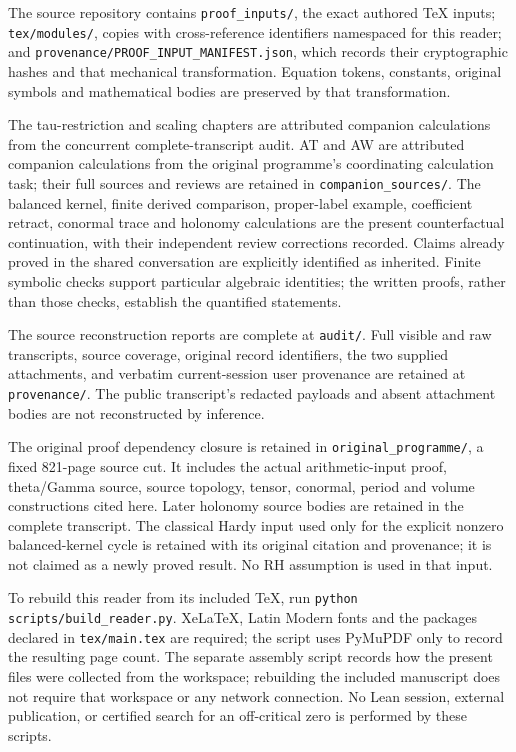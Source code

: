 \documentclass[11pt,a4paper,oneside,openany]{book}
\theoremstyle{definition}
\begin{document}
The source repository contains \texttt{proof\_inputs/}, the exact authored
TeX inputs; \texttt{tex/modules/}, copies with cross-reference identifiers
namespaced for this reader; and \nolinkurl{provenance/PROOF_INPUT_MANIFEST.json},
which records their cryptographic hashes and that mechanical transformation.
Equation tokens, constants, original symbols and mathematical bodies are
preserved by that transformation.

The tau-restriction and scaling chapters are attributed companion
calculations from the concurrent complete-transcript audit. AT and AW
are attributed companion calculations from the original programme's
coordinating calculation task; their full sources and reviews are retained
in \texttt{companion\_sources/}. The balanced
kernel, finite derived comparison, proper-label example, coefficient
retract, conormal trace and holonomy calculations are the present
counterfactual continuation, with their independent review corrections
recorded. Claims already proved in the shared conversation are explicitly
identified as inherited. Finite symbolic checks support particular
algebraic identities; the written proofs, rather than those checks,
establish the quantified statements.

The source reconstruction reports are complete at \texttt{audit/}. Full
visible and raw transcripts, source coverage, original record identifiers,
the two supplied attachments, and verbatim current-session user provenance
are retained at \texttt{provenance/}. The public transcript's redacted
payloads and absent attachment bodies are not reconstructed by inference.

The original proof dependency closure is retained in
\texttt{original\_programme/}, a fixed 821-page source cut. It includes
the actual arithmetic-input proof, theta/Gamma source, source topology,
tensor, conormal, period and volume constructions cited here. Later
holonomy source bodies are retained in the complete transcript. The
classical Hardy input used only for the explicit nonzero balanced-kernel
cycle is retained with its original citation and provenance; it is not
claimed as a newly proved result. No RH assumption is used in that input.

To rebuild this reader from its included TeX, run
\texttt{python scripts/build\_reader.py}. XeLaTeX, Latin Modern fonts
and the packages declared in \texttt{tex/main.tex} are required; the
script uses PyMuPDF only to record the resulting page count. The separate
assembly script records how the present files were collected from the
workspace; rebuilding the included manuscript does not require that
workspace or any network connection. No Lean session, external
publication, or certified search for an off-critical zero is performed
by these scripts.
\end{document}
